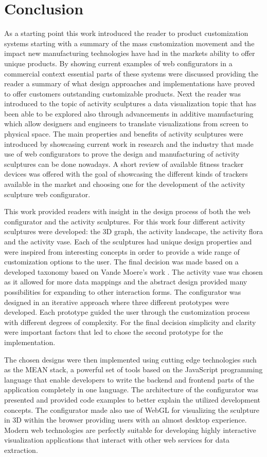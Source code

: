 \documentclass[../medieninformatik-arbeit.tex]{subfiles}
\begin{document}
\section{Conclusion}
\label{ch:conclusion}
As a starting point this work introduced the reader to product customization systems starting with a summary of the mass customization movement and the impact new manufacturing technologies have had in the markets ability to offer unique products. By showing current examples of web configurators in a commercial context essential parts of these systems were discussed providing the reader a summary of what design approaches and implementations have proved to offer customers outstanding customizable products. Next the reader was introduced to the topic of activity sculptures a data visualization topic that has been able to be explored also through advancements in additive manufacturing which allow designers and engineers to translate visualizations from screen to physical space. The main properties and benefits of activity sculptures were introduced by showcasing current work in research and the industry that made use of web configurators to prove the design and manufacturing of activity sculptures can be done nowadays. A short review of available fitness tracker devices was offered with the goal of showcasing the different kinds of trackers available in the market and choosing one for the development of the activity sculpture web configurator. 

This work provided readers with insight in the design process of both the web configurator and the activity sculptures. For this work four different activity sculptures were developed: the 3D graph, the activity landscape, the activity flora and the activity vase. Each of the sculptures had unique design properties and were inspired from interesting concepts in order to provide a wide range of customization options to the user. The final decision was made based on a developed taxonomy based on Vande Moere's work \cite{vande2009analyzing}. The activity vase was chosen as it allowed for more data mappings and the abstract design provided many possibilities for expanding to other interaction forms. The configurator was designed in an iterative approach where three different prototypes were developed. Each prototype guided the user through the customization process with different degrees of complexity. For the final decision simplicity and clarity were important factors that led to chose the second prototype for the implementation. 

The chosen designs were then implemented using cutting edge technologies such as the MEAN stack, a powerful set of tools based on the JavaScript programming language that enable developers to write the backend and frontend parts of the application completely in one language. The architecture of the configurator was presented and provided code examples to better explain the utilized development concepts. The configurator made also use of WebGL for visualizing the sculpture in 3D within the browser providing users with an almost desktop experience. Modern web technologies are perfectly suitable for developing highly interactive visualization applications that interact with other web services for data extraction. 
\end{document}
